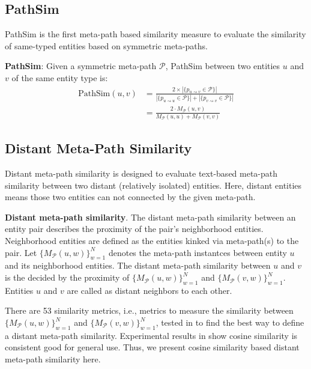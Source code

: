 \documentclass{acm_proc_article-csis8101}
\begin{document}
\subsection{PathSim}

PathSim \cite{sun2011pathsim} is the first meta-path based similarity measure to evaluate the similarity of same-typed entities based on symmetric meta-paths.

\begin{definition}
{\bf PathSim}: Given a symmetric meta-path $\mathcal{P}$, PathSim between two entities $u$ and $v$ of the same entity type is:
\begin{equation}
\begin{split}
\text{PathSim}(u, v) & = \frac{2 \times |\{p_{u\rightsquigarrow v}\in \mathcal{P}\}|}{|\{p_{u\rightsquigarrow u}\in \mathcal{P}\}| + |\{p_{v\rightsquigarrow v}\in \mathcal{P}\}|} \\
 & =\frac{2 \cdot M_{\mathcal{P}}(u, v)}{M_{\mathcal{P}}(u, u) + M_{\mathcal{P}}(v, v)}
\end{split}
\end{equation}
\end{definition}

\subsection{Distant Meta-Path Similarity}
Distant meta-path similarity\cite{wang2017distant} is designed to evaluate text-based meta-path similarity between two distant (relatively isolated) entities. Here, distant entities means those two entities can not connected by the given meta-path.

\begin{definition}
{\bf Distant meta-path similarity}. The distant meta-path similarity between an entity pair describes the proximity of the pair's neighborhood entities. Neighborhood entities are defined as the entities kinked via meta-path(s) to the pair. Let $\{M_{\mathcal{P}}(u, w)\}^{N}_{w=1}$ denotes the meta-path instantces between entity $u$ and its neighborhood entities. The distant meta-path similarity between $u$ and $v$ is the decided by the proximity of $\{M_{\mathcal{P}}(u, w)\}^{N}_{w=1}$ and $\{M_{\mathcal{P}}(v, w)\}^{N}_{w=1}$. Entities $u$ and $v$ are called as distant neighbors to each other.
\end{definition}

There are 53 similarity metrics, i.e., metrics to measure the similarity between $\{M_{\mathcal{P}}(u, w)\}^{N}_{w=1}$ and $\{M_{\mathcal{P}}(v, w)\}^{N}_{w=1}$, tested in \cite{wang2017distant} to find the best way to define a distant meta-path similarity. Experimental results in \cite{wang2017distant} show cosine similarity is consistent good for general use. Thus, we present cosine similarity based distant meta-path similarity here.
\end{document}

